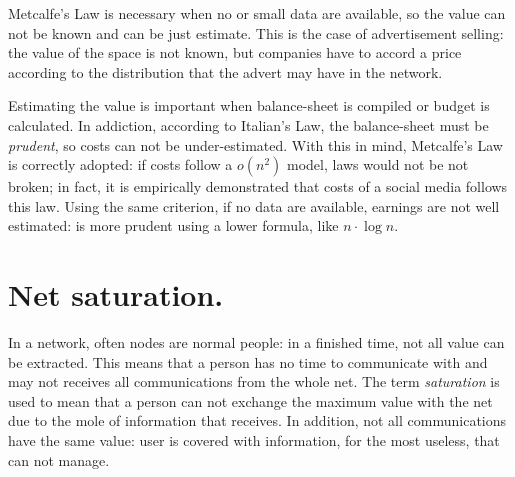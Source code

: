 \documentclass[12pt, a4page]{article}
\begin{document}
Metcalfe's Law is necessary when no or small data are available, so the value can not be known and can be just estimate.
This is the case of advertisement selling: the value of the space is not known, but companies have to accord a price according to the distribution that the advert may have in the network. \newline
 
Estimating the value is important when balance-sheet is compiled or budget is calculated. In addiction, according to Italian's Law, the balance-sheet must be \textit{prudent}, so costs can not be under-estimated.
With this in mind, Metcalfe's Law is correctly adopted: if costs follow a $o(n^2)$ model, laws would not be not broken; in fact, it is empirically demonstrated that costs of a social media follows this law.
Using the same criterion, if no data are available, earnings are not well estimated: is more prudent using a lower formula, like $n \cdot \log{n}$. \newline

\section{Net saturation.}
In a network, often nodes are normal people: in a finished time, not all value can be extracted.
This means that a person has no time to communicate with and may not receives all communications from the whole net.
The term \textit{saturation} is used to mean that a person can not exchange the maximum value with the net due to the mole of information that receives.
In addition, not all communications have the same value: user is covered with information, for the most useless, that can not manage.
\end{document}
